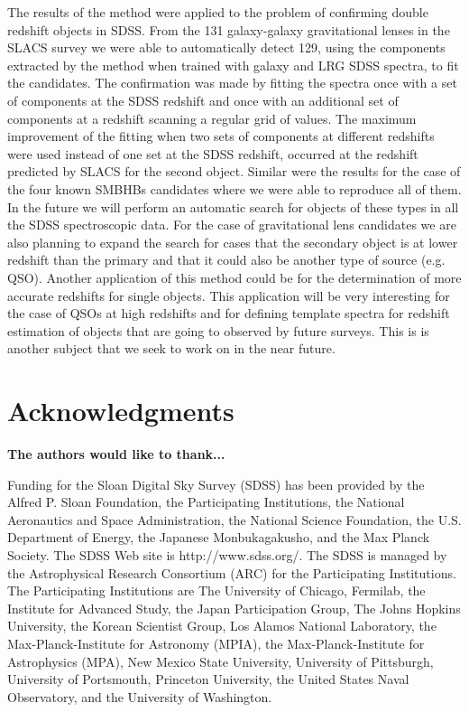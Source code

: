 \documentclass[apj]{emulateapj}
\begin{document}
The results of the method were applied to the problem of confirming double redshift objects in SDSS. From the 131 galaxy-galaxy gravitational lenses in the SLACS survey we were able to automatically detect 129, using the components extracted by the method when trained with galaxy and LRG SDSS spectra, to fit the candidates. The confirmation was made by fitting the spectra once with a set of components at the SDSS redshift and once with an additional set of components at a redshift scanning a regular grid of values. The maximum improvement of the fitting when two sets of components at different redshifts were used instead of one set at the SDSS redshift, occurred at the redshift predicted by SLACS for the second object. Similar were the results for the case of the four known SMBHBs candidates where we were able to reproduce all of them. In the future we will perform an automatic search for objects of these types in all the SDSS spectroscopic data. For the case of gravitational lens candidates we are also planning to expand the search for cases that the secondary object is at lower redshift than the primary and that it could also be another type of source (e.g. QSO). Another application of this method could be for the determination of more accurate redshifts for single objects. This application will be very interesting for the case of QSOs at high redshifts and for defining template spectra for redshift estimation of objects that are going to observed by future surveys. This is is another subject that we seek to work on in the near future.

\section{Acknowledgments}
\textbf{The authors would like to thank...}

Funding for the Sloan Digital Sky Survey (SDSS) has been provided by the Alfred P. Sloan Foundation, the Participating Institutions, the National Aeronautics and Space Administration, the National Science Foundation, the U.S. Department of Energy, the Japanese Monbukagakusho, and the Max Planck Society. The SDSS Web site is http://www.sdss.org/. The SDSS is managed by the Astrophysical Research Consortium (ARC) for the Participating Institutions. The Participating Institutions are The University of Chicago, Fermilab, the Institute for Advanced Study, the Japan Participation Group, The Johns Hopkins University, the Korean Scientist Group, Los Alamos National Laboratory, the Max-Planck-Institute for Astronomy (MPIA), the Max-Planck-Institute for Astrophysics (MPA), New Mexico State University, University of Pittsburgh, University of Portsmouth, Princeton University, the United States Naval Observatory, and the University of Washington.
\end{document}
